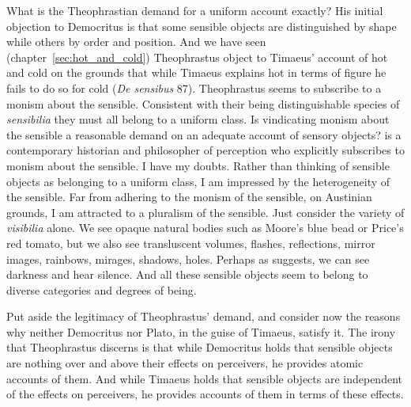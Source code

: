 What is the Theophrastian demand for a uniform account exactly? His initial objection to Democritus is that some sensible objects are distinguished by shape while others by order and position. And we have seen (chapter~\ref{sec:hot_and_cold}) Theophrastus object to Timaeus' account of hot and cold on the grounds that while Timaeus explains hot in terms of figure he fails to do so for cold (\emph{De sensibus} 87). Theophrastus seems to subscribe to a monism about the sensible. Consistent with their being distinguishable species of \emph{sensibilia} they must all belong to a uniform class. Is vindicating monism about the sensible a reasonable demand on an adequate account of sensory objects? \citet{Pasnau:1999ss,Pasnau:2000aa} is a contemporary historian and philosopher of perception who explicitly subscribes to monism about the sensible. I have my doubts. Rather than thinking of sensible objects as belonging to a uniform class, I am impressed by the heterogeneity of the sensible. Far from adhering to the monism of the sensible, on Austinian grounds, I am attracted to a pluralism of the sensible. Just consider the variety of \emph{visibilia} alone. We see opaque natural bodies such as Moore's \citeyearpar{Moore:1903uo} blue bead or Price's \citeyearpar{Price:1932fk} red tomato, but we also see transluscent volumes, flashes, reflections, mirror images, rainbows, mirages, shadows, holes. Perhaps as \citet{Sorensen:2004jk,Sorensen:2008kx,Sorensen:2009aa} suggests, we can see darkness and hear silence. And all these sensible objects seem to belong to diverse categories and degrees of being. 

Put aside the legitimacy of Theophrastus' demand, and consider now the reasons why neither Democritus nor Plato, in the guise of Timaeus, satisfy it. The irony that Theophrastus discerns is that while Democritus holds that sensible objects are nothing over and above their effects on perceivers, he provides atomic accounts of them. And while Timaeus holds that sensible objects are independent of the effects on perceivers, he provides accounts of them in terms of these effects.


